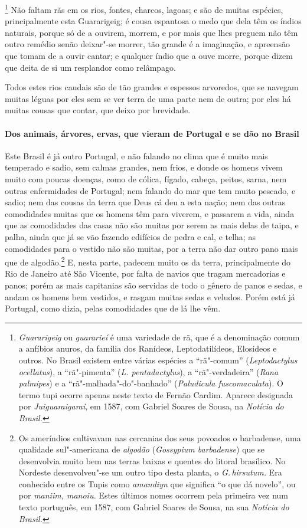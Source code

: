 \footnote{ \textit{Guararigeig} ou
\textit{guararieí} é uma variedade de rã, que é a denominação comum a
anfíbios anuros, da família dos Ranídeos, Leptodatilídeos, Elosídeos e
outros. No Brasil existem entre várias espécies a ``rã"-comum''
(\textit{Leptodactylus ocellatus}), a ``rã"-pimenta'' (\textit{L. pentadactylus}), 
a ``rã"-verdadeira'' (\textit{Rana palmipes}) e a
``rã"-malhada"-do"-banhado'' (\textit{Paludicula fuscomaculata}). O termo
tupi ocorre apenas neste texto de Fernão Cardim. Aparece designada por
\textit{Juiguaraigaraí}, em 1587, com Gabriel Soares de Sousa, na
\textit{Notícia do Brasil.}} Não faltam rãs em os rios,
fontes, charcos, lagoas; e são de muitas espécies, principalmente esta
Guararigeig; é cousa espantosa o medo que dela têm os índios
naturais, porque só de a ouvirem, morrem, e por mais que lhes preguem
não têm outro remédio senão deixar"-se morrer, tão grande é a
imaginação, e apreensão que tomam de a ouvir cantar; e qualquer índio
que a ouve morre, porque dizem que deita de si um resplandor como relâmpago.

 Todos estes rios caudais são de tão grandes e espessos arvoredos, que
se navegam muitas léguas por eles sem se ver terra de uma parte nem de
outra; por eles há muitas cousas que contar, que deixo por brevidade. 


\paragraph{Dos animais, árvores, ervas, que vieram de Portugal e se dão no Brasil}

 Este Brasil é já outro Portugal, e não falando no clima que é muito
mais temperado e sadio, sem calmas grandes, nem frios, e donde os
homens vivem muito com poucas doenças, como de cólica, fígado, cabeça,
peitos, sarna, nem outras enfermidades de Portugal; nem falando do mar
que tem muito pescado, e sadio; nem das cousas da terra que Deus cá deu
a esta nação; nem das outras comodidades muitas que os homens têm para
viverem, e passarem a vida, ainda que as comodidades das casas não são
muitas por serem as mais delas de taipa, e palha, ainda que já se vão
fazendo edifícios de pedra e cal, e telha; as comodidades para o
vestido não são muitas, por a terra não dar outro pano mais que de
algodão.\footnote{ Os ameríndios cultivavam nas cercanias dos seus
povoados o barbadense, uma qualidade sul"-americana de \textit{algodão}
(\textit{Gossypium barbadense}) que se desenvolvia muito bem nas terras baixas
e quentes do litoral brasílico. No Nordeste desenvolveu"-se um outro
tipo desta planta, o \textit{G.\,hirsutum.} Era conhecido entre os Tupis
como \textit{amandiyn} que significa ``o que dá novelo'', ou por
\textit{maniim, manoiu.} Estes últimos nomes ocorrem pela primeira vez
num texto português, em 1587, com Gabriel Soares de Sousa, na sua
\textit{Notícia do Brasil.}} E, nesta parte, padecem muito os da terra,
principalmente do Rio de Janeiro até São Vicente, por falta de navios
que tragam mercadorias e panos; porém as mais capitanias são servidas
de todo o gênero de panos e sedas, e andam os homens bem vestidos, e
rasgam muitas sedas e veludos. Porém está já Portugal, como dizia,
pelas comodidades que de lá lhe vêm.

